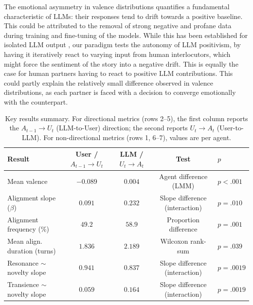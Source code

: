 \documentclass[11pt]{article}
\begin{document}
The emotional asymmetry in valence distributions quantifies a fundamental characteristic of LLMs: their responses tend to drift towards a positive baseline. This could be attributed to the removal of strong negative and profane data during training and fine-tuning of the models. While this has been established for isolated LLM output \cite{munoz2024contrasting,zanotto2024human}, our paradigm tests the autonomy of LLM positivism, by having it iteratively react to varying input from human interlocutors, which might force the sentiment of the story into a negative drift. This is equally the case for human partners having to react to positive LLM contributions. This could partly explain the relatively small difference observed in valence distributions, as each partner is faced with a decision to converge emotionally with the counterpart.
\begin{table}[t]
\centering
\footnotesize
\setlength{\tabcolsep}{10pt}
\renewcommand{\arraystretch}{1.15}
\begin{tabular}{lcccl}
\toprule
\textbf{Result}& 
\textbf{User / $A_{t-1}{\to}U_t$}& \textbf{LLM / $U_t{\to}A_t$}& \textbf{Test} & \textbf{$p$} \\
\midrule
Mean valence & $-0.089$ & $0.004$ & Agent difference (LMM) & $p < .001$ \\
Alignment slope ($\beta$) & $0.091$ & $0.232$ & Slope difference (interaction) & $p = .010$ \\
Alignment frequency (\%) & $49.2$ & $58.9$ & Proportion difference & $p = .001$\\
Mean align. duration (turns) & $1.836$ & $2.189$ & Wilcoxon rank-sum & $p = .039$ \\
\midrule
Resonance $\sim$ novelty slope & $0.941$ & $0.837$ & Slope difference (interaction) & $p = .0019$ \\
Transience $\sim$ novelty slope & $0.059$ & $0.164$ & Slope difference (interaction) & $p = .0019$ \\
\bottomrule
\end{tabular}
\caption{Key results summary. For directional metrics (rows 2--5), the first column reports the $A_{t-1}{\to}U_t$ (LLM-to-User) direction; the second reports $U_t{\to}A_t$ (User-to-LLM). For non-directional metrics (rows 1, 6--7), values are per agent.}
\label{tab:key_results_user_llm_tests}
\end{table}
\end{document}
